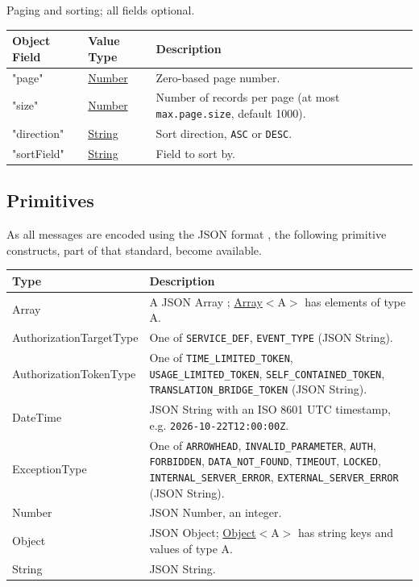 \documentclass[a4paper]{arrowhead}
\newcommand{\pdef}[1]{{\textcolor{ArrowheadGrey}{#1 \label{sec:model:primitives:#1} \label{sec:model:primitives:#1s}}}}
\newcommand{\pref}[1]{{\textcolor{ArrowheadGrey}{\hyperref[sec:model:primitives:#1]{#1}}}}
\begin{document}

Paging and sorting; all fields optional.


\noindent\begin{tabularx}{\textwidth}{| >{\raggedright\arraybackslash}p{3.9cm} | >{\raggedright\arraybackslash\small}p{5.3cm} | X |} \hline
\rowcolor{gray!33} Object Field & Value Type & Description \\ \hline
"page" & \pref{Number} & Zero-based page number. \\ \hline
"size" & \pref{Number} & Number of records per page (at most \texttt{max.\allowbreak{}page.\allowbreak{}size}, default 1000). \\ \hline
"direction" & \pref{String} & Sort direction, \texttt{ASC} or \texttt{DESC}. \\ \hline
"sort\allowbreak{}Field" & \pref{String} & Field to sort by. \\ \hline
\end{tabularx}



\subsection{Primitives}
\label{sec:model:primitives}

As all messages are encoded using the JSON format \cite{rfc8259}, the following primitive constructs, part of that standard, become available.

\noindent\begin{tabularx}{\textwidth}{| p{4.6cm} | X |} \hline
\rowcolor{gray!33} Type & Description \\ \hline
\pdef{Array} & A JSON Array \cite{rfc8259}; \pref{Array}$<$A$>$ has elements of type A. \\ \hline
\pdef{AuthorizationTargetType} & One of \texttt{SERVICE\_\allowbreak{}DEF}, \texttt{EVENT\_\allowbreak{}TYPE} (JSON String). \\ \hline
\pdef{AuthorizationTokenType} & One of \texttt{TIME\_\allowbreak{}LIMITED\_\allowbreak{}TOKEN}, \texttt{USAGE\_\allowbreak{}LIMITED\_\allowbreak{}TOKEN}, \texttt{SELF\_\allowbreak{}CONTAINED\_\allowbreak{}TOKEN}, \texttt{TRANSLATION\_\allowbreak{}BRIDGE\_\allowbreak{}TOKEN} (JSON String). \\ \hline
\pdef{DateTime} & JSON String with an ISO 8601 UTC timestamp, e.g. \texttt{2026-10-22T12:00:00Z}. \\ \hline
\pdef{ExceptionType} & One of \texttt{ARROWHEAD}, \texttt{INVALID\_\allowbreak{}PARAMETER}, \texttt{AUTH}, \texttt{FORBIDDEN}, \texttt{DATA\_\allowbreak{}NOT\_\allowbreak{}FOUND}, \texttt{TIMEOUT}, \texttt{LOCKED}, \texttt{INTERNAL\_\allowbreak{}SERVER\_\allowbreak{}ERROR}, \texttt{EXTERNAL\_\allowbreak{}SERVER\_\allowbreak{}ERROR} (JSON String). \\ \hline
\pdef{Number} & JSON Number, an integer. \\ \hline
\pdef{Object} & JSON Object; \pref{Object}$<$A$>$ has string keys and values of type A. \\ \hline
\pdef{String} & JSON String. \\ \hline
\end{tabularx}
\end{document}
